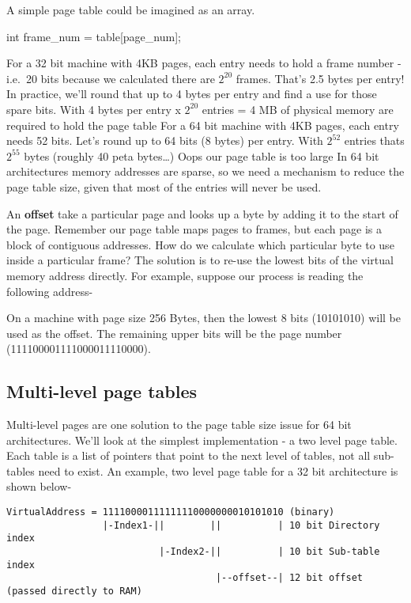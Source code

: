 \begin{enumerate}
A simple page table could be imagined as an array.
\begin{code}[language=C]
int frame_num = table[page_num]; 
\end{code}

For a 32 bit machine with 4KB pages, each entry needs to hold a frame number - i.e.~20 bits because we calculated there are $2^{20}$ frames. That's 2.5 bytes per entry! In practice, we'll round that up to 4 bytes per entry and find a use for those spare bits. With 4 bytes per entry x $2^{20}$ entries = 4 MB of physical memory are required to hold the page table 
For a 64 bit machine with 4KB pages, each entry needs 52 bits. Let's round up to 64 bits (8 bytes) per entry. With $2^{52}$ entries thats $2^{55}$ bytes (roughly 40 peta bytes\ldots{}) Oops our page table is too large 
In 64 bit architectures memory addresses are sparse, so we need a mechanism to reduce the page table size, given that most of the entries will never be used.

\begin{wrapfig}
\end{wrapfig}

An \textbf{offset} take a particular page and looks up a byte by adding it to the start of the page. Remember our page table maps pages to frames, but each page is a block of contiguous addresses. How do we calculate which particular byte to use inside a particular frame? The solution is to re-use the lowest bits of the virtual memory address directly. For example, suppose our process is reading the following address- 

On a machine with page size 256 Bytes, then the lowest 8 bits (10101010) will be used as the offset. The remaining upper bits will be the page number (111100001111000011110000).

\subsection{Multi-level page tables}\label{multi-level-page-tables}
 Multi-level pages are one solution to the page table size issue for 64 bit architectures. We'll look at the simplest implementation - a two level page table. Each table is a list of pointers that point to the next level of tables, not all sub-tables need to exist. An example, two level page table for a 32 bit architecture is shown below-

\begin{verbatim}
VirtualAddress = 11110000111111110000000010101010 (binary)
                 |-Index1-||        ||          | 10 bit Directory index
                           |-Index2-||          | 10 bit Sub-table index
                                     |--offset--| 12 bit offset (passed directly to RAM)
\end{verbatim}


\end{enumerate}
